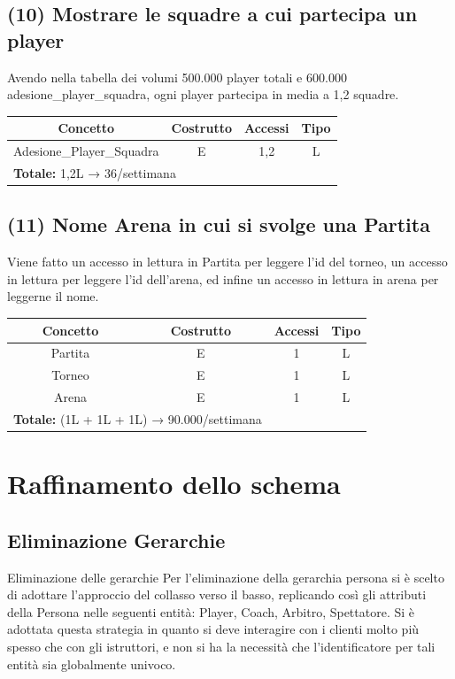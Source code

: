 \documentclass[a4paper,12pt]{report}
\begin{document}
\subsection*{(10) Mostrare le squadre a cui partecipa un player}
Avendo nella tabella dei volumi 500.000 player totali e 600.000 adesione\_player\_squadra, ogni player partecipa in media a 1,2 squadre.
\begin{center}
	\begin{tabular}{|c|c|c|c|}
		\hline\rowcolor{pink}
		Concetto & Costrutto & Accessi & Tipo\\
		\hline\hline		
		Adesione\_Player\_Squadra & E & 1,2 & L\\
		\hline
		\hline
		\multicolumn{2}{l}{%
			\textbf{Totale:} 1,2L → 36/settimana} \\
		\hline
	\end{tabular}
\end{center}
\subsection*{(11) Nome Arena in cui si svolge una Partita}
Viene fatto un accesso in lettura in Partita per leggere l'id del torneo, un accesso in lettura per leggere l'id dell'arena, ed infine un accesso in lettura in arena per leggerne il nome.
\begin{center}
	\begin{tabular}{|c|c|c|c|}
		\hline\rowcolor{pink}
		Concetto & Costrutto & Accessi & Tipo\\
		\hline\hline		
		Partita & E & 1 & L\\
		\hline
		Torneo & E & 1 & L\\
		\hline
		Arena & E & 1 & L\\
		\hline
		\multicolumn{2}{l}{%
			\textbf{Totale:} (1L + 1L + 1L) → 90.000/settimana} \\
		\hline
	\end{tabular}
\end{center}
\section{Raffinamento dello schema}
\subsection*{Eliminazione Gerarchie}
Eliminazione delle gerarchie
Per l’eliminazione della gerarchia persona si è scelto di adottare l’approccio del collasso verso
il basso, replicando così gli attributi della Persona nelle seguenti entità: Player, Coach, Arbitro, Spettatore. 
Si è adottata questa strategia in
quanto si deve interagire con i clienti molto più spesso che con gli istruttori, e non si ha la
necessità che l’identificatore per tali entità sia globalmente univoco.
\end{document}

